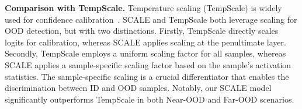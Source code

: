 \documentclass{article} %
\theoremstyle{plain}
\begin{document}
\begin{table}[hbt!]
\centering 
{}
\caption{\textbf{OOD detection results on CIFAR benchmarks.} SCALE outperform all postprocessors. Detailed results for each dataset are in the appendix.}\label{tab:main_cifar_results}
\end{table}

\textbf{Comparison with TempScale.}
Temperature scaling (TempScale) is widely used for confidence calibration~\citep{DBLP:conf/icml/GuoPSW17/TempScale}. 
SCALE and TempScale both leverage scaling for OOD detection, but with two distinctions. 
Firstly, TempScale directly scales logits for calibration, whereas SCALE applies scaling at the penultimate layer. Secondly, TempScale employs a uniform scaling factor for all samples, whereas SCALE applies a sample-specific scaling factor based on the sample's activation statistics. The sample-specific scaling is a crucial differentiator that enables the discrimination between ID and OOD samples. Notably, our SCALE model significantly outperforms TempScale in both Near-OOD and Far-OOD scenarios.
\end{document}

